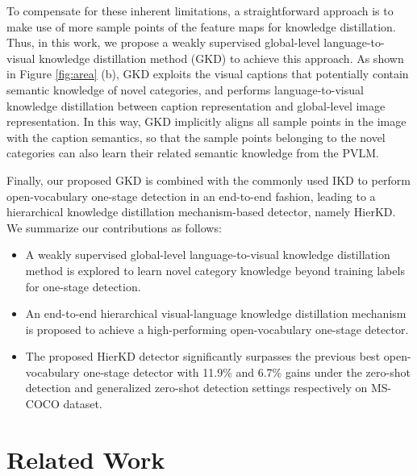 \documentclass[10pt,twocolumn,letterpaper]{article}
\begin{document}
To compensate for these inherent limitations, a straightforward approach is to make use of more sample points of the feature maps for knowledge distillation. Thus, in this work, we propose a weakly supervised global-level language-to-visual knowledge distillation method (GKD) to achieve this approach.  As shown in Figure \ref{fig:area} (b), GKD exploits the visual captions that potentially contain semantic knowledge of novel categories, and performs language-to-visual knowledge distillation between caption representation and global-level image representation. In this way, GKD implicitly aligns all sample points in the image with the caption semantics, so that the sample points belonging to the novel categories can also learn their related semantic knowledge from the PVLM.


Finally, our proposed GKD is combined with the commonly used IKD to perform open-vocabulary one-stage detection in an end-to-end fashion, leading to a hierarchical knowledge distillation mechanism-based detector, namely HierKD. We summarize our contributions as follows: 







 \begin{itemize}
     \item A weakly supervised global-level language-to-visual knowledge distillation method is explored to learn novel category knowledge beyond training labels for one-stage detection. 
     \item An end-to-end hierarchical visual-language knowledge distillation mechanism is proposed to achieve a high-performing open-vocabulary one-stage detector.  
     \item The proposed HierKD detector significantly surpasses the previous best open-vocabulary one-stage detector with 11.9\% and 6.7\%  gains under the zero-shot detection and generalized zero-shot detection settings respectively on MS-COCO dataset. 
 \end{itemize}

\section{Related Work}
\label{sec:rela}
\end{document}
